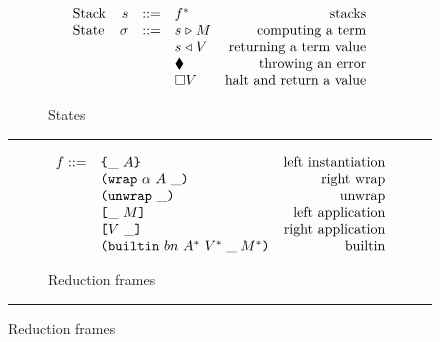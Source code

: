 \begin{figure}[!ht]
\caption{The CK machine}\label{fig:ck-machine}
\centering
\begin{subfigure}[c]{\linewidth}  %
{\small
\caption{States}
    \[\begin{array}{lrclr}
        \textrm{Stack} & s      & ::= & f^*                               & \textrm{stacks}\\
        \textrm{State} & \sigma & ::= & s \mathrel\triangleright M                  & \textrm{computing a term}\\
                       &        &     & s \mathrel\triangleleft V                 & \textrm{returning a term value}\\
                       &        &     & \blacklozenge{}                        & \textrm{throwing an error}\\
                       &        &     & \square V                        & \textrm{halt and return a value}


    \end{array}\]
}
\end{subfigure}

\vspace{3mm}
\hrule
\vspace{3mm}

\begin{subfigure}[c]{\linewidth}      %
{\small
\caption{Reduction frames}
\[
    \begin{array}{rlr}
      f ::= & \texttt{\{}\_ ~ A\texttt{\}}                     & \textrm{left instantiation}\\
            & \texttt{(} \texttt{wrap} ~ \alpha ~ A ~ \_ \texttt{)}            & \textrm{right wrap}\\
            & \texttt{(} \texttt{unwrap} ~ \_ \texttt{)}{}                        & \textrm{unwrap}\\
            & \texttt{[} \_ ~ M \texttt{]}                      & \textrm{left application}\\
            & \texttt{[} V ~ \_ \texttt{]}                     & \textrm{right application}\\
            & \texttt{(} \texttt{builtin} ~ bn ~ A^* ~ V^*\; \_\; M^* \texttt{)}        & \textrm{builtin}\\
    \end{array}
\]
}
\end{subfigure}
\vspace{3mm}
\hrule
\vspace{3mm}


\end{figure}
